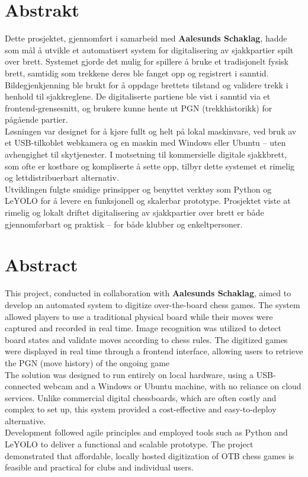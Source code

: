 \chapter*{Abstrakt}

Dette prosjektet, gjennomført i samarbeid med \textbf{Aalesunds Schaklag}, hadde som mål å utvikle et automatisert system for digitalisering av sjakkpartier spilt over brett. Systemet gjorde det mulig for spillere å bruke et tradisjonelt fysisk brett, samtidig som trekkene deres ble fanget opp og registrert i sanntid. Bildegjenkjenning ble brukt for å oppdage brettets tilstand og validere trekk i henhold til sjakkreglene. De digitaliserte partiene ble vist i sanntid via et frontend-grensesnitt, og brukere kunne hente ut PGN (trekkhistorikk) for pågående partier. \\

Løsningen var designet for å kjøre fullt og helt på lokal maskinvare, ved bruk av et USB-tilkoblet webkamera og en maskin med Windows eller Ubuntu – uten avhengighet til skytjenester. I motsetning til kommersielle digitale sjakkbrett, som ofte er kostbare og kompliserte å sette opp, tilbyr dette systemet et rimelig og lettdistribuerbart alternativ. \\

Utviklingen fulgte smidige prinsipper og benyttet verktøy som Python og LeYOLO for å levere en funksjonell og skalerbar prototype. Prosjektet viste at rimelig og lokalt driftet digitalisering av sjakkpartier over brett er både gjennomførbart og praktisk – for både klubber og enkeltpersoner.

\newpage

\chapter*{Abstract}
This project, conducted in collaboration with \textbf{Aalesunds Schaklag}, aimed to develop an automated system to digitize over-the-board chess games. The system allowed players to use a traditional physical board while their moves were captured and recorded in real time. Image recognition was utilized to detect board states and validate moves according to chess rules. The digitized games were displayed in real time through a frontend interface, allowing users to retrieve the PGN (move history) of the ongoing game \\

The solution was designed to run entirely on local hardware, using a USB-connected webcam and a Windows or Ubuntu machine, with no reliance on cloud services. Unlike commercial digital chessboards, which are often costly and complex to set up, this system provided a cost-effective and easy-to-deploy alternative. \\

Development followed agile principles and employed tools such as Python and LeYOLO to deliver a functional and scalable prototype. The project demonstrated that affordable, locally hosted digitization of OTB chess games is feasible and practical for clubs and individual users.
